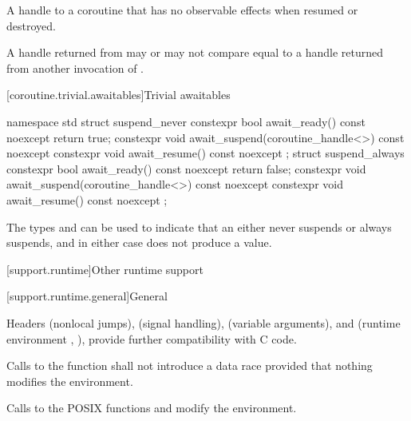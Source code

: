 \begin{itemdescr}
\pnum
\returns
A handle to a coroutine that has no observable effects
when resumed or destroyed.

\pnum
\remarks
A handle returned from  may or may not
compare equal to a handle returned from another invocation
of .
\end{itemdescr}

[coroutine.trivial.awaitables]{Trivial awaitables}

%
%
%
%
%
%
%
%
\begin{codeblock}
namespace std {
  struct suspend_never {
    constexpr bool await_ready() const noexcept { return true; }
    constexpr void await_suspend(coroutine_handle<>) const noexcept {}
    constexpr void await_resume() const noexcept {}
  };
  struct suspend_always {
    constexpr bool await_ready() const noexcept { return false; }
    constexpr void await_suspend(coroutine_handle<>) const noexcept {}
    constexpr void await_resume() const noexcept {}
  };
}
\end{codeblock}

\pnum
\begin{note}
The types  and  can be used
to indicate that an  either never
suspends or always suspends, and in either case does not produce a value.
\end{note}

[support.runtime]{Other runtime support}

[support.runtime.general]{General}

\pnum
{}%
%
Headers
 (nonlocal jumps),
 (signal handling),
 (variable arguments),
and
 (runtime environment , ),
provide further compatibility with C code.

\pnum
Calls to the function
%
 shall not introduce a data
race provided that nothing modifies the environment.
\begin{note}
Calls to the POSIX functions
%
 and
%
 modify the
environment.
\end{note}

